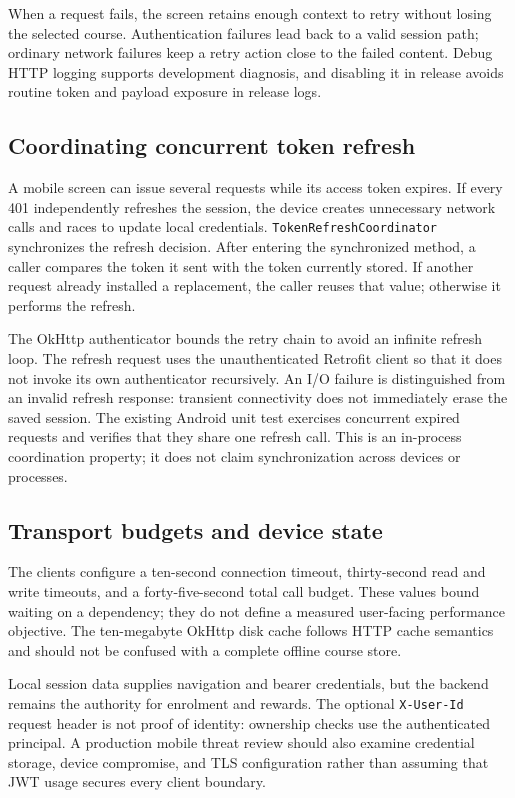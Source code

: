\documentclass[12pt,a4paper,oneside]{report}
\begin{document}
When a request fails, the screen retains enough context to retry without losing the
selected course. Authentication failures lead back to a valid session path; ordinary
network failures keep a retry action close to the failed content. Debug HTTP logging
supports development diagnosis, and disabling it in release avoids routine token and
payload exposure in release logs.

\subsection{Coordinating concurrent token refresh}
A mobile screen can issue several requests while its access token expires. If every
401 independently refreshes the session, the device creates unnecessary network calls
and races to update local credentials. \texttt{TokenRefreshCoordinator} synchronizes
the refresh decision. After entering the synchronized method, a caller compares the
token it sent with the token currently stored. If another request already installed a
replacement, the caller reuses that value; otherwise it performs the refresh.

\tokenrefreshdiagram

The OkHttp authenticator bounds the retry chain to avoid an infinite refresh loop.
The refresh request uses the unauthenticated Retrofit client so that it does not invoke
its own authenticator recursively. An I/O failure is distinguished from an invalid
refresh response: transient connectivity does not immediately erase the saved session.
The existing Android unit test exercises concurrent expired requests and verifies that
they share one refresh call. This is an in-process coordination property; it does not
claim synchronization across devices or processes.

\subsection{Transport budgets and device state}
The clients configure a ten-second connection timeout, thirty-second read and write
timeouts, and a forty-five-second total call budget. These values bound waiting on a
dependency; they do not define a measured user-facing performance objective. The
ten-megabyte OkHttp disk cache follows HTTP cache semantics and should not be confused
with a complete offline course store.

Local session data supplies navigation and bearer credentials, but the backend remains
the authority for enrolment and rewards. The optional \texttt{X-User-Id} request header
is not proof of identity: ownership checks use the authenticated principal. A production
mobile threat review should also examine credential storage, device compromise, and
TLS configuration rather than assuming that JWT usage secures every client boundary.
\end{document}
